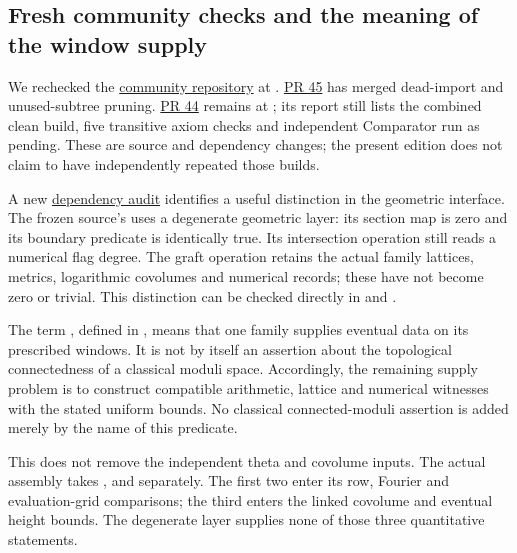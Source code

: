 \subsection{Fresh community checks and the meaning of the window supply}
\label{sec:sr-latest-community-check}
We rechecked the
\href{https://github.com/leanprover-community/riemann-hypothesis}{community repository}
at .
\href{https://github.com/leanprover-community/riemann-hypothesis/pull/45}{PR 45}
has merged dead-import and unused-subtree pruning.
\href{https://github.com/leanprover-community/riemann-hypothesis/pull/44}{PR 44}
remains at ;
its report still lists the combined clean build, five transitive axiom
checks and independent Comparator run as pending.
These are source and dependency changes; the present edition does not
claim to have independently repeated those builds.

A new
\href{https://github.com/aapolipponen/rh-lean-check-lumi/issues/2}{dependency audit}
identifies a useful distinction in the geometric interface.
The frozen source's  uses a degenerate
 geometric layer: its section map is zero and its
boundary predicate is identically true.
Its intersection operation still reads a numerical flag degree.
The graft operation retains the actual family lattices,
metrics, logarithmic covolumes and numerical records; these
have not become zero or trivial.
This distinction can be checked directly in
 and
.

The term , defined in
, means that one family supplies
eventual  data on its prescribed windows.
It is not by itself an assertion about the topological connectedness
of a classical moduli space.
Accordingly, the remaining supply problem is to construct compatible
arithmetic, lattice and numerical witnesses with the stated uniform
bounds. No classical connected-moduli assertion is added merely by
the name of this predicate.

This does not remove the independent theta and covolume inputs.
The actual  assembly
takes ,  and
 separately.
The first two enter its row, Fourier and evaluation-grid comparisons;
the third enters the linked covolume and eventual height bounds.
The degenerate  layer supplies none of those three
quantitative statements.

